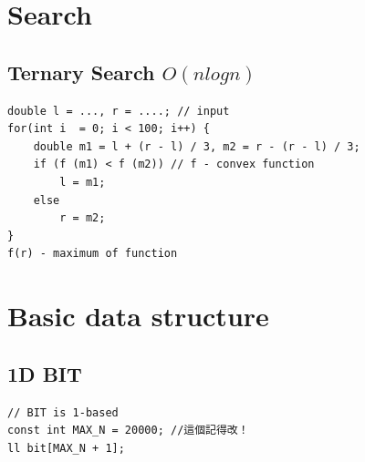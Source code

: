 \documentclass[10pt,oneside]{article}
\begin{document}
\begin{landscape}
\begin{multicols}{2}




\section{Search}

\subsection{Ternary Search $O(nlogn)$}

\begin{verbatim}
double l = ..., r = ....; // input
for(int i  = 0; i < 100; i++) {
    double m1 = l + (r - l) / 3, m2 = r - (r - l) / 3;
    if (f (m1) < f (m2)) // f - convex function
        l = m1;
    else
        r = m2;
}
f(r) - maximum of function
\end{verbatim}




\section{Basic data structure}

\subsection{1D BIT}

\begin{verbatim}
// BIT is 1-based
const int MAX_N = 20000; //這個記得改！
ll bit[MAX_N + 1];


\end{verbatim}
\end{multicols}
\end{landscape}
\end{document}
